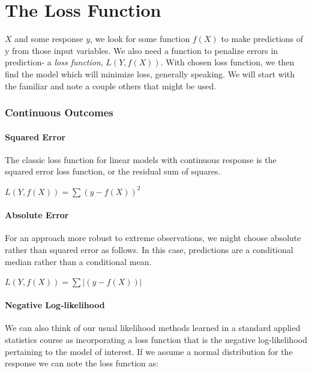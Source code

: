 \documentclass[english,nohyper,titlepage]{tufte-handout}\usepackage{knitr}
\begin{document}







\part{The Loss Function}
 $X$ and some response $y$, we look for some function $f(X)$ to make predictions of y from those input variables.  We also need a function to penalize errors in prediction- a \emph{loss function}, $L(Y, f(X))$.  With chosen loss function, we then find the model which will minimize loss, generally speaking.  We will start with the familiar and note a couple others that might be used.

\section{Continuous Outcomes}
\subsection{Squared Error}
The classic loss function for linear models with continuous response is the squared error loss function, or the residual sum of squares.

\vspace{.25cm}
\noindent$L(Y, f(X)) = \sum(y-f(X))^2$
\vspace{.25cm}

\subsection{Absolute Error}
For an approach more robust to extreme observations, we might choose absolute rather than squared error as follows.  In this case, predictions are a conditional median rather than a conditional mean.

\vspace{.25cm}
\noindent$L(Y, f(X)) = \sum|(y-f(X))|$
\vspace{.25cm}

\subsection{Negative Log-likelihood}
We can also think of our usual likelihood methods learned in a standard applied statistics course as incorporating a loss function that is the negative log-likelihood pertaining to the model of interest.  If we assume a normal distribution for the response we can note the loss function as:
\end{document}
